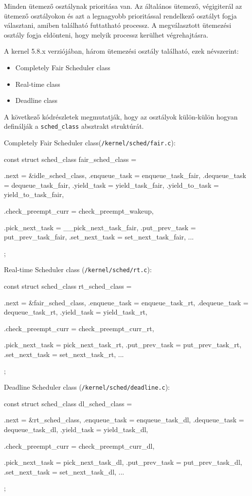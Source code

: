 Minden ütemező osztálynak prioritása van. 
Az általános ütemező, végigiterál az ütemező osztályokon és azt a legnagyobb prioritással rendelkező osztályt fogja választani, amiben található futtatható processz. A megválasztott ütemezési osztály fogja eldönteni, hogy melyik processz kerülhet végrehajtásra.

A kernel 5.8.x verziójában, három ütemezési osztály található, ezek névszerint: 
\begin{itemize}
	 \item Completely Fair Scheduler class
	 \item Real-time class
	 \item Deadline class
\end{itemize}
A következő kódrészletek megmutatják, hogy az osztályok külön-külön hogyan definálják a \texttt{sched\_class} absztrakt struktúrát.


Completely Fair Scheduler class(\texttt{/kernel/sched/fair.c}):
\begin{cpp}
const struct sched_class fair_sched_class = {
	.next			= &idle_sched_class,
	.enqueue_task		= enqueue_task_fair,
	.dequeue_task		= dequeue_task_fair,
	.yield_task		= yield_task_fair,
	.yield_to_task		= yield_to_task_fair,

	.check_preempt_curr	= check_preempt_wakeup,

	.pick_next_task		= __pick_next_task_fair,
	.put_prev_task		= put_prev_task_fair,
	.set_next_task          = set_next_task_fair,
...
};
\end{cpp}

Real-time Scheduler class (\texttt{/kernel/sched/rt.c}):
\begin{cpp}
const struct sched_class rt_sched_class = {
	.next			= &fair_sched_class,
	.enqueue_task		= enqueue_task_rt,
	.dequeue_task		= dequeue_task_rt,
	.yield_task		= yield_task_rt,

	.check_preempt_curr	= check_preempt_curr_rt,

	.pick_next_task		= pick_next_task_rt,
	.put_prev_task		= put_prev_task_rt,
	.set_next_task          = set_next_task_rt,
...
};
\end{cpp}

Deadline Scheduler class (\texttt{/kernel/sched/deadline.c}):
\begin{cpp}
const struct sched_class dl_sched_class = {
	.next			= &rt_sched_class,
	.enqueue_task		= enqueue_task_dl,
	.dequeue_task		= dequeue_task_dl,
	.yield_task		= yield_task_dl,

	.check_preempt_curr	= check_preempt_curr_dl,

	.pick_next_task		= pick_next_task_dl,
	.put_prev_task		= put_prev_task_dl,
	.set_next_task		= set_next_task_dl,
...
};
\end{cpp}

